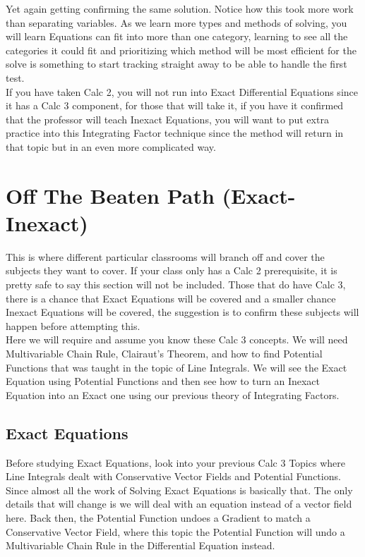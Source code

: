 \documentclass[12pt]{article}
\begin{document}
Yet again getting confirming the same solution. Notice how this took more work than separating variables. As we learn more types and methods of solving, you will learn Equations can fit into more than one category, learning to see all the categories it could fit and prioritizing which method will be most efficient for the solve is something to start tracking straight away to be able to handle the first test. \\

If you have taken Calc 2, you will not run into Exact Differential Equations since it has a Calc 3 component, for those that will take it, if you have it confirmed that the professor will teach Inexact Equations, you will want to put extra practice into this Integrating Factor technique since the method will return in that topic but in an even more complicated way.

\pagebreak

\section{Off The Beaten Path (Exact-Inexact)}

This is where different particular classrooms will branch off and cover the subjects they want to cover. If your class only has a Calc 2 prerequisite, it is pretty safe to say this section will not be included. Those that do have Calc 3, there is a chance that Exact Equations will be covered and a smaller chance Inexact Equations will be covered, the suggestion is to confirm these subjects will happen before attempting this. \\

Here we will require and assume you know these Calc 3 concepts. We will need Multivariable Chain Rule, Clairaut's Theorem, and how to find Potential Functions that was taught in the topic of Line Integrals. We will see the Exact Equation using Potential Functions and then see how to turn an Inexact Equation into an Exact one using our previous theory of Integrating Factors.

\subsection{Exact Equations}

Before studying Exact Equations, look into your previous Calc 3 Topics where Line Integrals dealt with Conservative Vector Fields and Potential Functions. Since almost all the work of Solving Exact Equations is basically that. The only details that will change is we will deal with an equation instead of a vector field here. Back then, the Potential Function undoes a Gradient to match a Conservative Vector Field, where this topic the Potential Function will undo a Multivariable Chain Rule in the Differential Equation instead. \\
\end{document}
